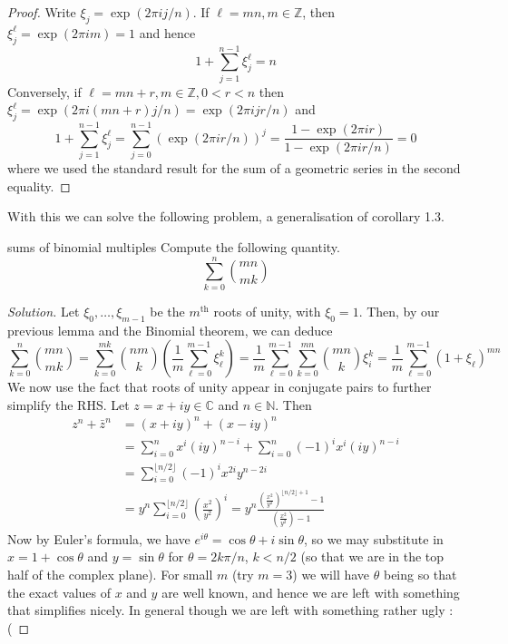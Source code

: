 \documentclass{article}
\begin{document}
\begin{proof}
    Write $\xi_j = \exp(2\pi i j/n)$. If $\ell = mn, m \in \mathbb{Z}$, then $\xi_j^\ell = \exp(2\pi i m) = 1$ and hence
    \[1 + \sum_{j=1}^{n-1}\xi_j^\ell = n\] 
    Conversely, if $\ell = mn + r, m \in \mathbb{Z}, 0 < r < n$ then $\xi_j^\ell = \exp(2\pi i (mn+r)j/n) = \exp(2\pi i jr/n)$ and 
    \[1 + \sum_{j=1}^{n-1} \xi_j^\ell = \sum_{j=0}^{n-1}\left(\exp(2\pi i r/n)\right)^j = \frac{1 - \exp(2\pi i r)}{1 - \exp(2\pi i r/n)} = 0\]
    where we used the standard result for the sum of a geometric series in the second equality. 
\end{proof}

With this we can solve the following problem, a generalisation of corollary 1.3.

\begin{problem}[]{sums of binomial multiples}
    Compute the following quantity. 
    \[\sum_{k=0}^n \binom{mn}{mk}\]
\end{problem}

\begin{proof}[Solution]
    Let $\xi_0, \dots, \xi_{m-1}$ be the $m^\text{th}$ roots of unity, with $\xi_0 = 1$. Then, by our previous lemma and the Binomial theorem,
    we can deduce 
    \[\sum_{k=0}^{n}\binom{mn}{mk} = \sum_{k=0}^{mk}\binom{nm}{k}\left(\frac{1}{m}\sum_{\ell = 0}^{m-1}\xi_\ell^k\right) 
    = \frac{1}{m}\sum_{\ell = 0}^{m-1} \sum_{k=0}^{mn} \binom{mn}{k}\xi_i^k = \frac{1}{m}\sum_{\ell = 0}^{m-1} (1+\xi_\ell)^{mn}\]
    We now use the fact that roots of unity appear in conjugate pairs to further simplify the RHS. Let $z = x + iy \in \mathbb{C}$
    and $n \in \mathbb{N}$. Then \begin{align*}
        z^n + \bar{z}^n &= (x + iy)^n + (x - iy)^n \\ 
        &= \sum_{i = 0}^n x^i (iy)^{n-i} + \sum_{i = 0}^n (-1)^i x^i (iy)^{n-i} \\ 
        &= \sum_{i = 0}^{\lfloor n/2 \rfloor} (-1)^i x^{2i} y^{n - 2i} \\ 
        &= y^n \sum_{i = 0}^{\lfloor n/2 \rfloor} \left(\frac{x^2}{y^2}\right)^i = y^n 
        \frac{\left(\frac{x^2}{y^2}\right)^{\lfloor n/2 \rfloor + 1} - 1}{\left(\frac{x^2}{y^2}\right) - 1}
    \end{align*}
    Now by Euler's formula, we have $e^{i\theta} = \cos \theta + i \sin \theta$, so we may substitute in 
    $x = 1 + \cos\theta$ and $y = \sin \theta$ for $\theta = 2k\pi/n$, $k < n/2$ (so that we are in the top half of 
    the complex plane). For small $m$ (try $m=3$) we will have $\theta$ being so that the exact values of $x$ and $y$ are well 
    known, and hence we are left with something that simplifies nicely. In general though we are left with something 
    rather ugly :(
\end{proof}
\end{document}
